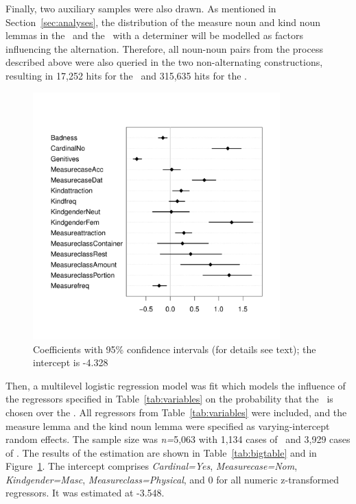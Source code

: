 Finally, two auxiliary samples were also drawn.
As mentioned in Section~\ref{sec:analyses}, the distribution of the measure noun and kind noun lemmas in the \NACb\ and the \PGCd\ with a determiner will be modelled as factors influencing the alternation.
Therefore, all noun-noun pairs from the process described above were also queried in the two non-alternating constructions, resulting in 17,252 hits for the \PGCd\ and 315,635 hits for the \NACb.

\begin{figure}[hb!]
  \centering
  \includegraphics[width=0.85\textwidth]{../R/output/corpus_fixeffs}
  \caption{Coefficients with 95\% confidence intervals (for details see text); the intercept is -4.328}
  \label{fig:fixeffs}
\end{figure}

Then, a multilevel logistic regression model was fit which models the influence of the regressors specified in Table~\ref{tab:variables} on the probability that the \PGCa\ is chosen over the \NACa.
All regressors from Table~\ref{tab:variables} were included, and the measure lemma and the kind noun lemma were specified as varying-intercept random effects.
The sample size was \textit{n=}5,063 with 1,134 cases of \PGCa\ and 3,929 cases of \NACa.
The results of the estimation are shown in Table~\ref{tab:bigtable} and in Figure~\ref{fig:fixeffs}.
The intercept comprises \textit{Cardinal=Yes}, \textit{Measurecase=Nom}, \textit{Kindgender=Masc}, \textit{Measureclass=Physical}, and 0 for all numeric z-transformed regressors.
It was estimated at -3.548.

